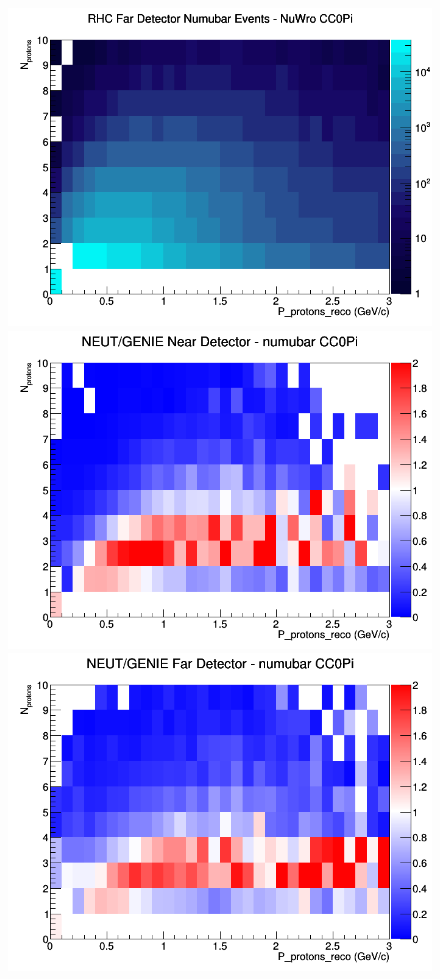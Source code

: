 \begin{figure}[h]
\endminipage
{}
\includegraphics[width=\linewidth]{eff_N_P/GAr/protons/CC0Pi_RHC_FD_numubar_N_P_NuWro.png}
\endminipage
\newline
{}
\includegraphics[width=\linewidth]{eff_N_P/GAr/protons/ratios/CC0Pi_NEUT_GENIE_numubar_near_N_P.png}
\endminipage
{}
\includegraphics[width=\linewidth]{eff_N_P/GAr/protons/ratios/CC0Pi_NEUT_GENIE_numubar_far_N_P.png}

\end{figure}
